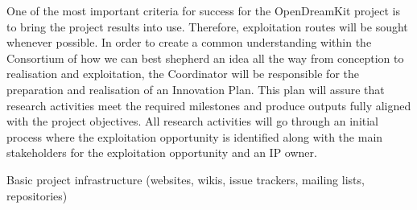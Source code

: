 \begin{workpackage}
\begin{tasklist}
\begin{task}[title=Innovation management,wphases=6-48!.2,
id=project-innovation-management,lead=UPSud,PM=10,
partners={LL,UV,UJF,UB,UO,USH,USO,SA,UW,JU,UK,US,ZH,SR}] One of the
  most important criteria for success for the OpenDreamKit project is
  to bring the project results into use. Therefore, exploitation
  routes will be sought whenever possible. In order to create a common
  understanding within the Consortium of how we can best shepherd an
  idea all the way from conception to realisation and
  exploitation, the Coordinator will be responsible for the
  preparation and realisation of an Innovation Plan. This plan will assure that
  research activities meet the required milestones and produce outputs 
  fully aligned with the project objectives.  All
  research activities will go through an initial process where the
  exploitation opportunity is identified along with the main
  stakeholders for the exploitation opportunity and an IP owner.
\end{task}
\end{tasklist}

%


\begin{wpdelivs}
\begin{wpdeliv}[due=1,miles=startup,id=infrastructure,dissem=PU,nature=DEC,lead=UPSud]{Basic project infrastructure 
    (websites, wikis, issue trackers, mailing lists, repositories)}
\end{wpdeliv}


\end{wpdelivs}
\end{workpackage}
